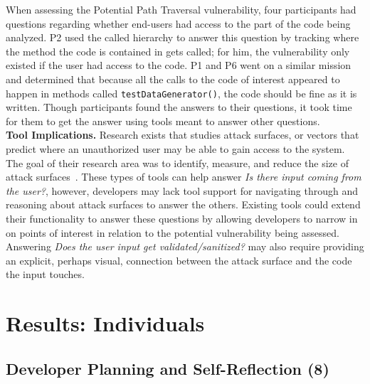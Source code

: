 \documentclass[conference]{IEEEtran}
\begin{document}
When assessing the Potential Path Traversal vulnerability, four participants had questions regarding whether end-users had access to the part of the code being analyzed.
P2 used the called hierarchy to answer this question by tracking where the method the code is contained in gets called; for him, the vulnerability only existed if the user had access to the code.
P1 and P6 went on a similar mission and determined that because all the calls to the code of interest appeared to happen in methods called \texttt{testDataGenerator()}, the code should be fine as it is written.
Though participants found the answers to their questions, it took time for them to get the answer using tools meant to answer other questions.
\\

\noindent\textbf{Tool Implications.}
Research exists that studies attack surfaces, or vectors that predict where an unauthorized user may be able to gain access to the system.
The goal of their research area was to identify, measure, and reduce the size of attack surfaces~\cite{manadhata2011attack, bartel2012automatically}. These types of tools can help answer \textit{Is there input coming from the user?}, however, developers may lack tool support for navigating through and reasoning about attack surfaces to answer the others.
Existing tools could extend their functionality to answer these questions by allowing developers to narrow in on points of interest in relation to the potential vulnerability being assessed.
Answering \textit{Does the user input get validated/sanitized?} may also require providing an explicit, perhaps visual, connection between the attack surface and the code the input touches.




\section{Results: Individuals}
\label{sec:results-i}



\noindent\subsection{\textbf{Developer Planning and Self-Reflection (8)}} \label{dpr}
\end{document}
